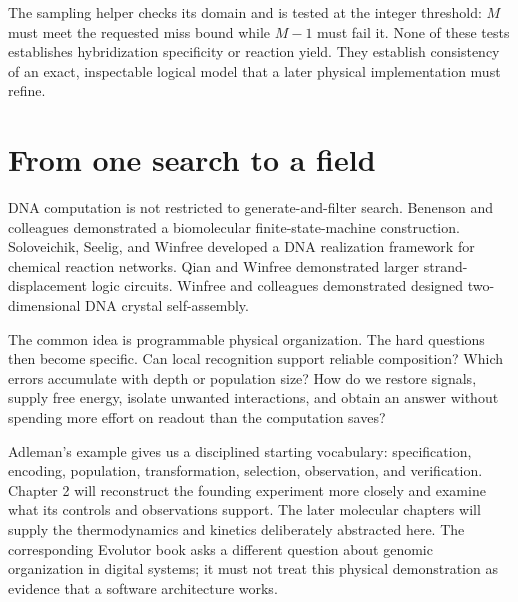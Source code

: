 The sampling helper checks its domain and is tested at the integer threshold: $M$ must meet the requested miss bound while $M-1$ must fail it. None of these tests establishes hybridization specificity or reaction yield. They establish consistency of an exact, inspectable logical model that a later physical implementation must refine.

\section{From one search to a field}\label{sec:frontier}
DNA computation is not restricted to generate-and-filter search. Benenson and colleagues demonstrated a biomolecular finite-state-machine construction.\cite{benenson} Soloveichik, Seelig, and Winfree developed a DNA realization framework for chemical reaction networks.\cite{crn} Qian and Winfree demonstrated larger strand-displacement logic circuits.\cite{circuits} Winfree and colleagues demonstrated designed two-dimensional DNA crystal self-assembly.\cite{assembly}

The common idea is programmable physical organization. The hard questions then become specific. Can local recognition support reliable composition? Which errors accumulate with depth or population size? How do we restore signals, supply free energy, isolate unwanted interactions, and obtain an answer without spending more effort on readout than the computation saves?

Adleman's example gives us a disciplined starting vocabulary: specification, encoding, population, transformation, selection, observation, and verification. Chapter 2 will reconstruct the founding experiment more closely and examine what its controls and observations support. The later molecular chapters will supply the thermodynamics and kinetics deliberately abstracted here. The corresponding Evolutor book asks a different question about genomic organization in digital systems; it must not treat this physical demonstration as evidence that a software architecture works.


